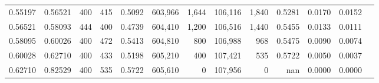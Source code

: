 \begin{tabular}{rrrrrrrrrrrrr}
0.55197 & 0.56521 &    400 & 415 &                                     0.5092 & 603,966 &   1,644 & 106,116 &   1,840 & 0.5281 & 0.0170 & 0.0152 \\
0.56521 & 0.58093 &    444 & 400 &                                     0.4739 & 604,410 &   1,200 & 106,516 &   1,440 & 0.5455 & 0.0133 & 0.0111 \\
0.58095 & 0.60026 &    400 & 472 &                                     0.5413 & 604,810 &     800 & 106,988 &     968 & 0.5475 & 0.0090 & 0.0074 \\
0.60028 & 0.62710 &    400 & 433 &                                     0.5198 & 605,210 &     400 & 107,421 &     535 & 0.5722 & 0.0050 & 0.0037 \\
0.62710 & 0.82529 &    400 & 535 &                                     0.5722 & 605,610 &       0 & 107,956 &       0 &    nan & 0.0000 & 0.0000 \\
\bottomrule
\end{tabular}
